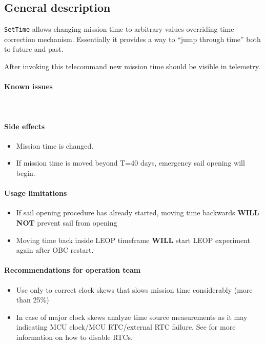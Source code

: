 

\subsection{General description}
\texttt{SetTime} allows changing mission time to arbitrary values overriding time correction mechanism. Essentially it provides a way to ``jump through time'' both to future and past.

After invoking this telecommand new mission time should be visible in telemetry.

\paragraph{Known issues} \mbox{}\\
\None

\paragraph{Side effects}
\begin{itemize}
	\item Mission time is changed.
	\item If mission time is moved beyond T=40 days, emergency sail opening will begin.
\end{itemize}

\paragraph{Usage limitations}
\begin{itemize}
	\item If sail opening procedure has already started, moving time backwards \textbf{WILL NOT} prevent sail from opening
	\item Moving time back inside LEOP timeframe \textbf{WILL} start LEOP experiment again after OBC restart.
\end{itemize}

\paragraph{Recommendations for operation team}
\begin{itemize}
	\item Use only to correct clock skews that slows mission time considerably (more than 25\%)
	\item In case of major clock skews analyze time source measurements as it may indicating MCU clock/MCU RTC/external RTC failure. See  for more information on how to disable RTCs.
\end{itemize}



